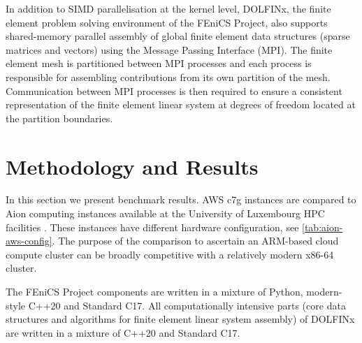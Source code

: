 In addition to SIMD parallelisation at the kernel level, DOLFINx, the finite
element problem solving environment of the FEniCS Project, also supports
shared-memory parallel assembly of global finite element data structures
(sparse matrices and vectors) using the Message Passing Interface (MPI). The
finite element mesh is partitioned between MPI processes and each process is
responsible for assembling contributions from its own partition of the mesh.
Communication between MPI processes is then required to ensure a consistent
representation of the finite element linear system at degrees of freedom
located at the partition boundaries.


\section*{Methodology and Results}
In this section we present benchmark results. AWS c7g instances are compared to
Aion computing instances available at the University of Luxembourg HPC
facilities \citep{VCPKVO_HPCCT22}. These instances have different hardware
configuration, see \autoref{tab:aion-aws-config}. The purpose of the comparison
to ascertain an ARM-based cloud compute cluster can be broadly competitive with
a relatively modern x86-64 cluster.

The FEniCS Project components are written in a mixture of Python, modern-style
C++20 and Standard C17. All computationally intensive parts (core data
structures and algorithms for finite element linear system assembly) of DOLFINx
are written in a mixture of C++20 and Standard C17.


